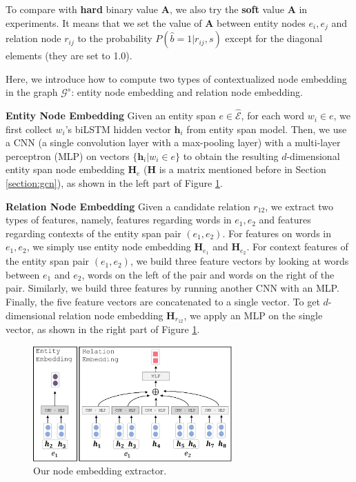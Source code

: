 To compare with \textbf{hard} binary value $\mathbf{A}$,
we also try the \textbf{soft} value $\mathbf{A}$ in experiments.
It means that we set the value of $\mathbf{A}$ between entity nodes $e_i, e_j$ and relation node $r_{ij}$ 
to the probability $P(\hat{b} = 1 | r_{ij}, s)$ except for the diagonal elements (they are set to 1.0).

Here, we introduce how to compute two types of contextualized node embedding in the graph $\mathcal{G}^s$:
entity node embedding and relation node embedding.

\vspace{0.5em}
\noindent
\textbf{Entity Node Embedding}  
Given an entity span $e \in \hat{\mathcal{E}}$,
for each word $w_i \in e$,
we first collect $w_i$'s biLSTM hidden vector $\mathbf{h}_i$ from entity span model.
Then, we use a CNN (a single convolution layer with a max-pooling layer) with a multi-layer perceptron (MLP)
on vectors $\{\mathbf{h}_i | w_i \in e \}$
to obtain the resulting $d$-dimensional entity span node embedding $\mathbf{H}_{e}$ ($\mathbf{H}$ is a matrix mentioned before in Section \ref{section:gcn}),
as shown in the left part of Figure \ref{fig:node}.

\vspace{0.5em}
\noindent
\textbf{Relation Node Embedding}
Given a candidate relation $r_{12}$, 
we extract two types of features,
namely, features regarding words in $e_1, e_2$ 
and features regarding contexts of the entity span pair $(e_1, e_2)$.
For features on words in $e_1, e_2$,
we simply use entity node  embedding $\mathbf{H}_{e_1}$ and $\mathbf{H}_{e_2}$.
For context features of the entity span pair $(e_1, e_2)$,
we build three feature vectors by looking at words
between $e_1$ and $e_2$, words on the left of the
pair and words on the right of the pair.
Similarly, we build three features by running another CNN with an MLP.
Finally, the five feature vectors are concatenated to a single vector.
To get $d$-dimensional relation node embedding $\mathbf{H}_{r_{12}}$, 
we apply an MLP on the single vector,
as shown in the right part of Figure \ref{fig:node}.
\begin{figure} 
    \begin{center}
        \includegraphics[width=3.0in]{../images/node-repr.pdf}
    \end{center}
    \caption{Our node embedding extractor.}
    \label{fig:node}
\end{figure}
